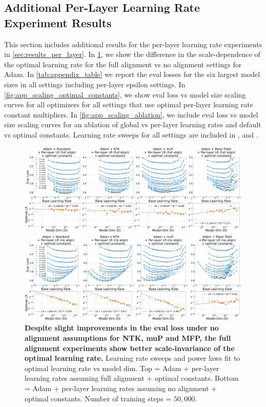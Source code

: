 \subsection{Additional Per-Layer Learning Rate Experiment Results}
\label{sec:app_per_layer_lr_results}
This section includes additional results for the per-layer learning rate experiments in \cref{sec:results_per_layer}. In \cref{fig:app_hparam_transfer_align_comparison}, we show the difference in the scale-dependence of the optimal learning rate for the full alignment vs no alignment settings for Adam. In \cref{tab:appendix_table} we report the eval losses for the six largest model sizes in all settings including per-layer epsilon settings. In \cref{fig:app_scaling_optimal_constants}, we show eval loss vs model size scaling curves for all optimizers for all settings that use optimal per-layer learning rate constant multipliers. In \cref{fig:app_scaling_ablation}, we include eval loss vs model size scaling curves for an ablation of global vs per-layer learning rates and default vs optimal constants. Learning rate sweeps for all settings are included in ,  and .


\vfill
\begin{figure}[h]
\includegraphics[width=\linewidth]{icml2024/figures/lr_sweeps/appendix/adam/adam+50k_steps_per_module_lr_optimal_constants.pdf}

\figvspace

\includegraphics[width=\linewidth]{icml2024/figures/lr_sweeps/appendix/adam/adam+50k_steps_per_module_lr_optimal_constants_no_align.pdf}
\caption{\textbf{Despite slight improvements in the eval loss under no alignment assumptions for NTK, muP and MFP, the full alignment experiments show better scale-invariance of the optimal learning rate.} Learning rate sweeps and power laws fit to optimal learning rate vs model dim. Top = Adam + per-layer learning rates assuming full alignment + optimal constants. Bottom = Adam + per-layer learning rates assuming no alignment + optimal constants. Number of training steps = $50{,}000$.}
\label{fig:app_hparam_transfer_align_comparison}
\end{figure}
\vfill
\clearpage

